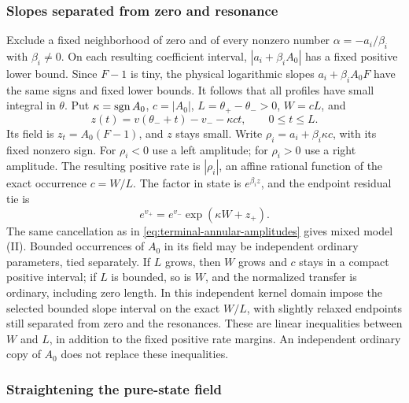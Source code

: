 \subsubsection{Slopes separated from zero and resonance}

Exclude a fixed neighborhood of zero and of every nonzero number
\(\alpha=-a_i/\beta_i\) with \(\beta_i\ne0\).  On each resulting
coefficient interval, \(|a_i+\beta_iA_0|\) has a fixed positive lower
bound.  Since \(F-1\) is tiny, the physical logarithmic slopes
\(a_i+\beta_iA_0F\) have the same signs and fixed lower bounds.  It
follows that all profiles have small integral in \(\theta\).
Put \(\kappa=\operatorname{sgn} A_0\), \(c=|A_0|\),
\(L=\theta_+-\theta_->0\), \(W=cL\), and
\[
 z(t)=v(\theta_-+t)-v_- -\kappa ct,\qquad 0\le t\le L.
\]
Its field is \(z_t=A_0(F-1)\), and \(z\) stays small.  Write
\(\rho_i=a_i+\beta_i\kappa c\), with its fixed nonzero sign.  For
\(\rho_i<0\) use a left amplitude; for \(\rho_i>0\) use a right
amplitude.  The resulting positive rate is \(|\rho_i|\), an affine
rational function of the exact occurrence \(c=W/L\).  The factor in
state is \(e^{\beta_i z}\), and the endpoint residual tie is
\begin{equation}\label{eq:terminal-mixed-end-tie}
 e^{v_+}=e^{v_-}\exp(\kappa W+z_+).
\end{equation}
The same cancellation as in \eqref{eq:terminal-annular-amplitudes}
gives mixed model (II).  Bounded occurrences of \(A_0\) in its field
may be independent ordinary parameters, tied separately.  If \(L\)
grows, then \(W\) grows and \(c\) stays in a compact positive interval;
if \(L\) is bounded, so is \(W\), and the normalized transfer is
ordinary, including zero length.
In this independent kernel domain impose the selected bounded slope
interval on the exact \(W/L\), with slightly relaxed endpoints still
separated from zero and the resonances.  These are linear inequalities
between \(W\) and \(L\), in addition to the fixed positive rate margins.
An independent ordinary copy of \(A_0\) does not replace these
inequalities.

\subsubsection{Straightening the pure-state field}

